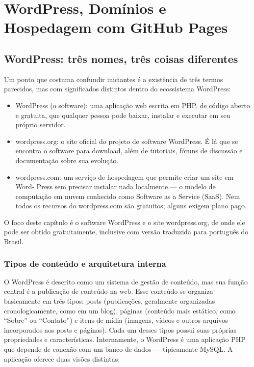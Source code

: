 \chapter{WordPress, Domínios e Hospedagem com GitHub Pages}

\section{WordPress: três nomes, três coisas diferentes}

Um ponto que costuma confundir iniciantes é a existência de três termos parecidos, mas com significados distintos dentro do ecossistema WordPress:

\begin{itemize}
  \item WordPress (o software): uma aplicação web escrita em PHP, de código aberto e gratuita, que qualquer pessoa pode baixar, instalar e executar em seu próprio servidor.
\end{itemize}

\begin{itemize}
  \item wordpress.org: o site oficial do projeto de software WordPress. É lá que se encontra o software para download, além de tutoriais, fóruns de discussão e documentação sobre sua evolução.
\end{itemize}

\begin{itemize}
  \item wordpress.com: um serviço de hospedagem que permite criar um site em Word- Press sem precisar instalar nada localmente — o modelo de computação em nuvem conhecido como Software as a Service (SaaS). Nem todos os recursos do wordpress.com são gratuitos; alguns exigem plano pago.
\end{itemize}

O foco deste capítulo é o software WordPress e o site wordpress.org, de onde ele pode ser obtido gratuitamente, inclusive com versão traduzida para português do Brasil.

\subsection{Tipos de conteúdo e arquitetura interna}

O WordPress é descrito como um sistema de gestão de conteúdo, mas sua função central é a publicação de conteúdo na web. Esse conteúdo se organiza basicamente em três tipos: posts (publicações, geralmente organizadas cronologicamente, como em um blog), páginas (conteúdo mais estático, como “Sobre” ou “Contato”) e itens de mídia (imagens, vídeos e outros arquivos incorporados aos posts e páginas). Cada um desses tipos possui suas próprias propriedades e características. Internamente, o WordPress é uma aplicação PHP que depende de conexão com um banco de dados — tipicamente MySQL. A aplicação oferece duas visões distintas:

